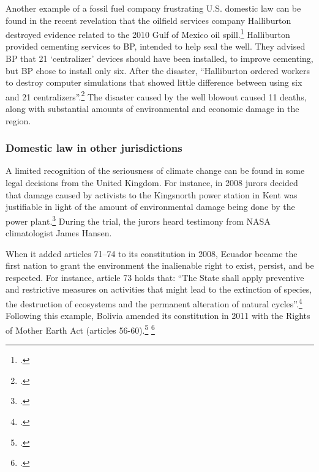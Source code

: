 Another example of a fossil fuel company frustrating U.S. domestic law can be found in the recent revelation that the oilfield services company Halliburton destroyed evidence related to the 2010 Gulf of Mexico oil spill.\footcite[][]{Halliburton2013}
Halliburton provided cementing services to BP, intended to help seal the well.
They advised BP that 21 `centralizer' devices should have been installed, to improve cementing, but BP chose to install only six.
After the disaster, ``Halliburton ordered workers to destroy computer simulations that showed little difference between using six and 21 centralizers''.\footcite[][]{Halliburton2013}
The disaster caused by the well blowout caused 11 deaths, along with substantial amounts of environmental and economic damage in the region.



		\subsubsection{Domestic law in other jurisdictions}
		
		
		
A limited recognition of the seriousness of climate change can be found in some legal decisions from the United Kingdom.
For instance, in 2008 jurors decided that damage caused by activists to the Kingsnorth power station in Kent was justifiable in light of the amount of environmental damage being done by the power plant.\footcite[][]{JuryDecides}
During the trial, the jurors heard testimony from NASA climatologist James Hansen.



When it added articles 71--74 to its constitution in 2008, Ecuador became the first nation to grant the environment the inalienable right to exist, persist, and be respected.
For instance, article 73 holds that: ``The State shall apply preventive and restrictive measures on activities that might lead to the extinction of species, the destruction of ecosystems and the permanent alteration of natural cycles''.\footcite[][]{EcuadorConstitution}
Following this example, Bolivia amended its constitution in 2011 with the Rights of Mother Earth Act (articles 56-60).\footcite[][p. 28--29]{BoliviaConstitution} \footcite[][]{BoliviaGives}



